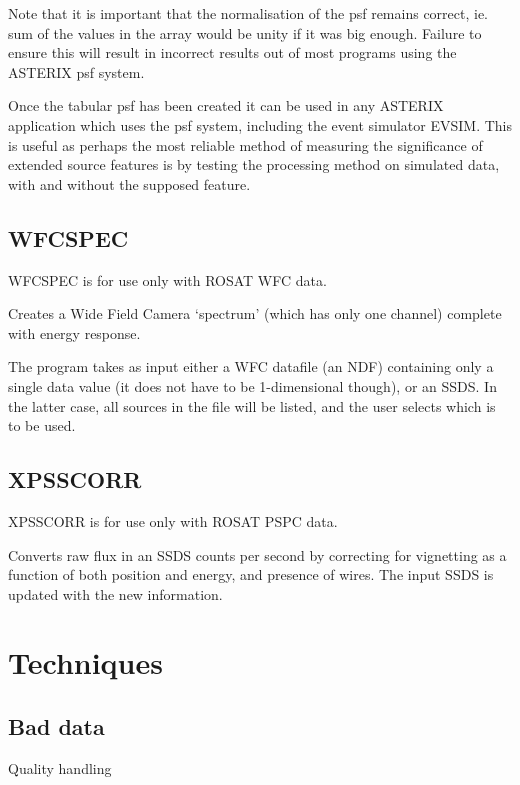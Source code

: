 Note that it is important that the normalisation of the psf remains
correct, ie. sum of the values in the array would be unity if it was
big enough. Failure to ensure this will result in incorrect results out
of most programs using the ASTERIX psf system.

Once the tabular psf has been created it can be used in any ASTERIX
application which uses the psf system, including the event simulator
EVSIM. This is useful as perhaps the most reliable method of measuring
the significance of extended source features is by testing the 
processing method on simulated data, with and without the supposed
feature.

\subsection{WFCSPEC}

WFCSPEC is for use only with ROSAT WFC data.
\PARtabstart
{}
\PARtabend

Creates a Wide Field Camera `spectrum' (which has only one
channel) complete with energy response.

The program takes as input either a WFC datafile (an NDF)
containing only a single data value (it does not have to
be 1-dimensional though), or an SSDS.
In the latter case, all sources
in the file will be listed, and the user selects which
is to be used.


\subsection{XPSSCORR}

XPSSCORR is for use only with ROSAT PSPC data.
\PARtabstart
{}
\PARtabend

Converts raw flux in an SSDS 
counts per second by correcting for vignetting as a function of both
position and energy, and presence of wires. The input SSDS is updated
with the new information.

\newpage
\section{Techniques}
\label{techniques}
\subsection{Bad data}
    Quality handling
